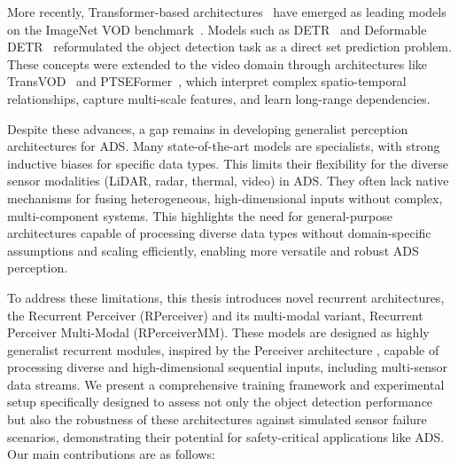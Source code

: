 More recently, Transformer-based architectures~\cite{vaswaniAttentionAllYou2023} have emerged as leading models on the ImageNet VOD benchmark~\cite{russakovskyImageNetLargeScale2015}. Models such as DETR~\cite{carionEndtoEndObjectDetection2020} and Deformable DETR~\cite{zhuDeformableDETRDeformable2021} reformulated the object detection task as a direct set prediction problem. These concepts were extended to the video domain through architectures like TransVOD~\cite{zhouTransVODEndtoEndVideo2023} and PTSEFormer~\cite{wangPTSEFormerProgressiveTemporalSpatial2022}, which interpret complex spatio-temporal relationships, capture multi-scale features, and learn long-range dependencies.


Despite these advances, a gap remains in developing generalist perception architectures for ADS. Many state-of-the-art models are specialists, with strong inductive biases for specific data types. This limits their flexibility for the diverse sensor modalities (LiDAR, radar, thermal, video) in ADS. They often lack native mechanisms for fusing heterogeneous, high-dimensional inputs without complex, multi-component systems. This highlights the need for general-purpose architectures capable of processing diverse data types without domain-specific assumptions and scaling efficiently, enabling more versatile and robust ADS perception.



To address these limitations, this thesis introduces novel recurrent architectures, the Recurrent Perceiver (RPerceiver) and its multi-modal variant, Recurrent Perceiver Multi-Modal (RPerceiverMM). These models are designed as highly generalist recurrent modules, inspired by the Perceiver architecture \cite{jaeglePerceiverGeneralPerception2021}, capable of processing diverse and high-dimensional sequential inputs, including multi-sensor data streams. We present a comprehensive training framework and experimental setup specifically designed to assess not only the object detection performance but also the robustness of these architectures against simulated sensor failure scenarios, demonstrating their potential for safety-critical applications like ADS. Our main contributions are as follows:

